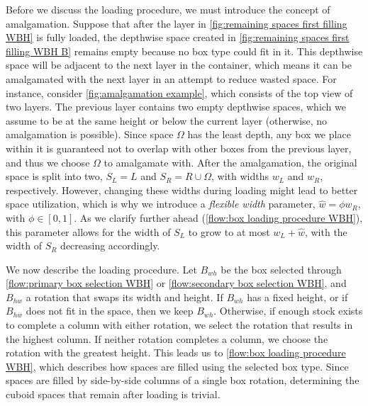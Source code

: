 



Before we discuss the loading procedure, we must introduce the concept of amalgamation. Suppose that after the layer in \cref{fig:remaining spaces first filling WBH} is fully loaded, the depthwise space created in \cref{fig:remaining spaces first filling WBH B} remains empty because no box type could fit in it. This depthwise space will be adjacent to the next layer in the container, which means it can be amalgamated with the next layer in an attempt to reduce wasted space. For instance, consider \cref{fig:amalgamation example}, which consists of the top view of two layers. The previous layer contains two empty depthwise spaces, which we assume to be at the same height or below the current layer (otherwise, no amalgamation is possible). Since space $\Omega$ has the least depth, any box we place within it is guaranteed not to overlap with other boxes from the previous layer, and thus we choose $\Omega$ to amalgamate with. After the amalgamation, the original space is split into two, $S_{L} = L$ and $S_{R} = R \cup \Omega$, with widths $w_L$ and $w_R$, respectively. However, changing these widths during loading might lead to better space utilization, which is why we introduce a \emph{flexible width} parameter, $\hat{w} = \phi w_{R}$, with $\phi \in [0,1]$. As we clarify further ahead (\cref{flow:box loading procedure WBH}), this parameter allows for the width of $S_L$ to grow to at most $w_L + \hat{w}$, with the width of $S_R$ decreasing accordingly.



We now describe the loading procedure. Let $B_{wh}$ be the box selected through \cref{flow:primary box selection WBH} or \cref{flow:secondary box selection WBH}, and $B_{hw}$ a rotation that swaps its width and height. If $B_{wh}$ has a fixed height, or if $B_{hw}$ does not fit in the space, then we keep $B_{wh}$. Otherwise, if enough stock exists to complete a column with either rotation, we select the rotation that results in the highest column. If neither rotation completes a column, we choose the rotation with the greatest height. This leads us to \cref{flow:box loading procedure WBH}, which describes how spaces are filled using the selected box type. Since spaces are filled by side-by-side columns of a single box rotation, determining the cuboid spaces that remain after loading is trivial.

